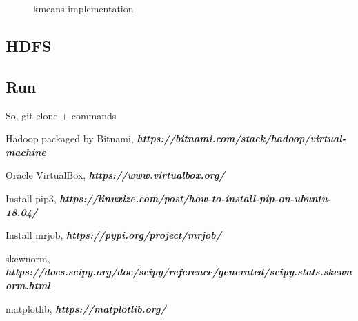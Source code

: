 \documentclass[11pt]{article}
\begin{document}
	\begin{figure}[H]
		\caption{kmeans implementation}
	\end{figure}
	
	\subsection{HDFS}   

	\subsection{Run}
	So, git clone + commands 
	

	\begin{thebibliography}{1}
		Hadoop packaged by Bitnami, \textit{\textbf{https://bitnami.com/stack/hadoop/virtual-machine}}
	
	
		Oracle VirtualBox, \textit{\textbf{https://www.virtualbox.org/}}
		
		Install pip3, \textit{\textbf{https://linuxize.com/post/how-to-install-pip-on-ubuntu-18.04/}}
		
		Install mrjob, \textit{\textbf{https://pypi.org/project/mrjob/}}
		
		skewnorm, \textit{\textbf{https://docs.scipy.org/doc/scipy/reference/generated/scipy.stats.skewnorm.html}}
		
		matplotlib, \textit{\textbf{https://matplotlib.org/}}
		
		
	\end{thebibliography}
	
	
\end{document}
